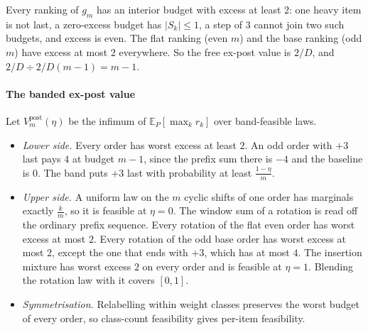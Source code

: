 Every ranking of $g_{m}$ has an interior budget with excess at least $2$: one heavy item is
not last, a zero-excess budget has $|S_{k}|\le1$, a step of $3$ cannot join two such budgets,
and excess is even. The flat ranking (even $m$) and the base ranking (odd $m$) have excess
at most $2$ everywhere. So the free ex-post value is $2/D$, and $2/D\div2/D(m-1)=m-1$.


\paragraph{The banded ex-post value} Let $V^{\mathrm{post}}_{m}(\eta)$ be the infimum of
$\mathbb{E}_{P}[\max_{k}r_{k}]$ over band-feasible laws.
\begin{itemize}
\item \emph{Lower side.} Every order has worst excess at least $2$. An odd order with $+3$
last pays $4$ at budget $m-1$, since the prefix sum there is $-4$ and the baseline is $0$. The
band puts $+3$ last with probability at least $\frac{1-\eta}{m}$.
\item \emph{Upper side.} A uniform law on the $m$ cyclic shifts of one order has marginals
exactly $\frac{k}{m}$, so it is feasible at $\eta=0$. The window sum of a rotation is read off
the ordinary prefix sequence. Every rotation of the flat even order has worst excess at most
$2$. Every rotation of the odd base order has worst excess at most $2$, except the one that
ends with $+3$, which has at most $4$. The insertion mixture has worst excess $2$ on every
order and is feasible at $\eta=1$. Blending the rotation law with it covers $[0,1]$.
\item \emph{Symmetrisation.} Relabelling within weight classes preserves the worst budget
of every order, so class-count feasibility gives per-item feasibility.
\end{itemize}


